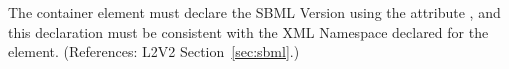 The  container element must declare the SBML Version
using the attribute , and this declaration must be
consistent with the XML Namespace declared for the 
element.  (References: L2V2 Section~\ref{sec:sbml}.)
